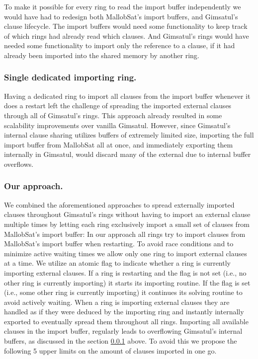 \documentclass[12pt,a4paper,twoside]{scrartcl}
\numberwithin{equation}{section}
\begin{document}
To make it possible for every ring to read the import buffer independently we would have had to redesign both MallobSat's import buffers, and Gimsatul's clause lifecycle. The import buffers would need some functionality to keep track of which rings had already read which clauses. And Gimsatul's rings would have needed some functionality to import only the reference to a clause, if it had already been imported into the shared memory by another ring. 

\subsubsection{Single dedicated importing ring.}
\label{sec:singleDedicatedImportRing}

Having a dedicated ring to import all clauses from the import buffer whenever it does a restart left the challenge of spreading the imported external clauses through all of Gimsatul's rings. This approach already resulted in some scalability improvements over vanilla Gimsatul. However, since Gimsatul's internal clause sharing utilizes buffers of extremely limited size, importing the full import buffer from MallobSat all at once, and immediately exporting them internally in Gimsatul, would discard many of the external due to internal buffer overflows.

\subsubsection{Our approach.}

We combined the aforementioned approaches to spread externally imported clauses throughout Gimsatul's rings without having to import an external clause multiple times by letting each ring exclusively import a small set of clauses from MallobSat's import buffer: 
In our approach all rings try to import clauses from MallobSat's import buffer when restarting. To avoid race conditions and to minimize active waiting times we allow only one ring to import external clauses at a time. We utilize an atomic flag to indicate whether a ring is currently importing external clauses. If a ring is restarting and the flag is not set (i.e., no other ring is currently importing) it starts its importing routine. If the flag is set (i.e., some other ring is currently importing) it continues its solving routine to avoid actively waiting. 
When a ring is importing external clauses they are handled as if they were deduced by the importing ring and instantly internally exported to eventually spread them throughout all rings. Importing all available clauses in the import buffer, regularly leads to overflowing Gimsatul's internal buffers, as discussed in the section \ref{sec:singleDedicatedImportRing} above. To avoid this we propose the following 5 upper limits on the amount of clauses imported in one go.
\end{document}
